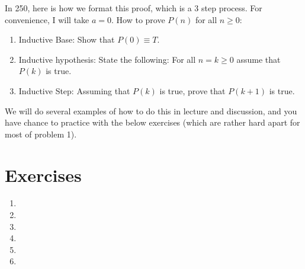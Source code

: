 In 250, here is how we format this proof, which is a 3 step process. For convenience, I will take $a = 0$. How to prove $P(n)$ for all $n \geq 0$:
\begin{enumerate}
    \item Inductive Base: Show that $P(0) \equiv T$.
    \item Inductive hypothesis: State the following: For all $n = k \geq 0$ assume that $P(k)$ is true.
    \item Inductive Step: Assuming that $P(k)$ is true, prove that $P(k + 1)$ is true.
\end{enumerate}

We will do several examples of how to do this in lecture and discussion, and you have chance to practice with the below exercises (which are rather hard apart for most of problem 1).

\section{Exercises}
\begin{enumerate}
    \item 
    \item 
    \item 
    \item 
    \item 
    \item 
\end{enumerate}

